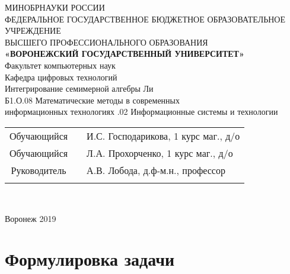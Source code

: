 \documentclass[a4paper]{article}
\begin{document}

\begin{center}
\hfill \break
\large{МИНОБРНАУКИ РОССИИ}\\
\footnotesize{ФЕДЕРАЛЬНОЕ ГОСУДАРСТВЕННОЕ БЮДЖЕТНОЕ ОБРАЗОВАТЕЛЬНОЕ УЧРЕЖДЕНИЕ}\\
\footnotesize{ВЫСШЕГО ПРОФЕССИОНАЛЬНОГО ОБРАЗОВАНИЯ}\\
\small{\textbf{«ВОРОНЕЖСКИЙ ГОСУДАРСТВЕННЫЙ УНИВЕРСИТЕТ»}}\\
\hfill \break
Факультет компьютерных наук\\
 \hfill \break
\normalsize{Кафедра цифровых технологий}\\
\hfill\break
\hfill \break
\hfill \break
\hfill \break
\large{Интегрирование семимерной алгебры Ли}\\
\hfill \break
\hfill \break
\hfill \break
\hfill \break
\normalsize{Б1.О.08 Математические методы в современных\\\hfill информационных технологиях
\hfill {}.02 Информационные системы и технологии}\\
\hfill \break
\hfill \break
\hfill \break
\hfill \break
\hfill \break
\end{center}

\normalsize{
\begin{tabular}{ccl}
Обучающийся & \underline{\hspace{3cm}} &И.С. Господарикова, 1 курс маг., д/о\\
Обучающийся & \underline{\hspace{3cm}} &Л.А. Прохорченко, 1 курс маг., д/о\\
Руководитель & \underline{\hspace{3cm}}&А.В. Лобода, д.ф-м.н., профессор \\\\
\end{tabular}
}\\
\hfill \break
\hfill \break
\hfill \break
\hfill \break
\hfill \break
\hfill \break
\hfill \break
\begin{center} Воронеж 2019 \end{center}
\thispagestyle{empty} %


\newpage

    \tableofcontents %
\newpage

\section{Формулировка задачи}
\end{document}
